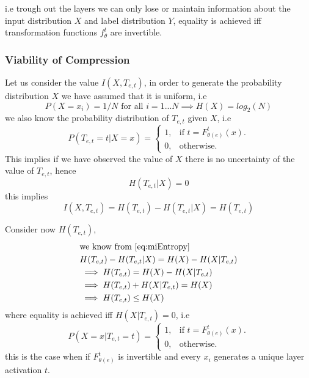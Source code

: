 i.e trough out the layers we can only lose or maintain information about the
input distribution $X$ and label distribution $Y$, equality is achieved iff
transformation functions $f_{\theta}^t$ are invertible.

\subsubsection{Viability of Compression}

Let us consider the value $I(X, T_{e,t})$, in order to generate the probability
distribution $X$ we have assumed that it is uniform, i.e
\begin{equation*}
  P(X=x_i) = 1 / N \text{ for all } i = 1...N \implies H(X) = log_2(N)
\end{equation*}
we also know the probability distribution of $T_{e,t}$ given $X$, i.e
\begin{equation*}
  P(T_{e,t}=t|X=x) = \begin{cases}
    1, & \text{if } t = F_{\theta(e)}^t(x). \\
    0, & \text{otherwise}.
  \end{cases}
\end{equation*}
This implies if we have observed the value of $X$ there is no uncertainty of the
value of $T_{e,t}$, hence 
\begin{equation*}
  H(T_{e,t}|X) = 0
\end{equation*}
this implies
\begin{equation*}
  I(X, T_{e,t}) = H(T_{e,t}) - H(T_{e,t} | X) = H(T_{e,t})
\end{equation*}

Consider now $H(T_{e,t})$,
\begin{align}
  &\text{we know from \autoref{eq:miEntropy} } \nonumber \\
  &H(T_{e,t}) - H(T_{e,t}|X) = H(X) - H(X|T_{e,t}) \nonumber \\
  &\implies H(T_{e,t}) = H(X) - H(X|T_{e,t}) \nonumber \\
  &\implies H(T_{e,t}) + H(X|T_{e,t}) = H(X) \nonumber \\
  &\implies H(T_{e,t}) \leq H(X)
\label{eq:hh}
\end{align}
where equality is achieved iff $H(X|T_{e,t})=0$, i.e
\begin{equation*}
  P(X=x|T_{e,t}=t) = \begin{cases}
    1, & \text{if } t = F_{\theta(e)}^t(x). \\
    0, & \text{otherwise}.
  \end{cases}
\end{equation*}
this is the case when if $F_{\theta(e)}^t$ is invertible and every $x_i$
generates a unique layer activation $t$.

